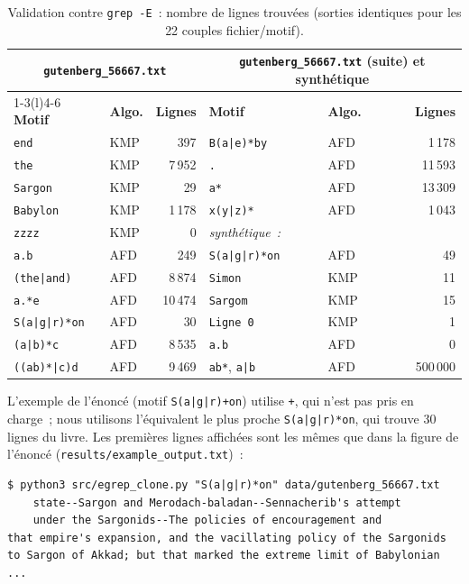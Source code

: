 \documentclass[11pt,a4paper]{article}
\begin{document}
\begin{table}[ht]
\centering
\small
\begin{tabular}{llr@{\hspace{2.5em}}llr}
\toprule
\multicolumn{3}{c}{\texttt{gutenberg\_56667.txt}} & \multicolumn{3}{c}{\texttt{gutenberg\_56667.txt} (suite) et synthétique} \\
\cmidrule(r){1-3}\cmidrule(l){4-6}
\textbf{Motif} & \textbf{Algo.} & \textbf{Lignes} & \textbf{Motif} & \textbf{Algo.} & \textbf{Lignes} \\
\midrule
\texttt{end}         & KMP & 397    & \texttt{B(a|e)*by}   & AFD & 1\,178 \\
\texttt{the}         & KMP & 7\,952 & \texttt{.}           & AFD & 11\,593 \\
\texttt{Sargon}      & KMP & 29     & \texttt{a*}          & AFD & 13\,309 \\
\texttt{Babylon}     & KMP & 1\,178 & \texttt{x(y|z)*}     & AFD & 1\,043 \\
\texttt{zzzz}        & KMP & 0      & \textit{synthétique~:} & & \\
\texttt{a.b}         & AFD & 249    & \texttt{S(a|g|r)*on} & AFD & 49 \\
\texttt{(the|and)}   & AFD & 8\,874 & \texttt{Simon}       & KMP & 11 \\
\texttt{a.*e}        & AFD & 10\,474 & \texttt{Sargom}     & KMP & 15 \\
\texttt{S(a|g|r)*on} & AFD & 30     & \texttt{Ligne 0}     & KMP & 1 \\
\texttt{(a|b)*c}     & AFD & 8\,535 & \texttt{a.b}         & AFD & 0 \\
\texttt{((ab)*|c)d}  & AFD & 9\,469 & \texttt{ab*}, \texttt{a|b} & AFD & 500\,000 \\
\bottomrule
\end{tabular}
\caption{Validation contre \texttt{grep -E}~: nombre de lignes trouvées
(sorties identiques pour les 22 couples fichier/motif).}
\label{tab:validation}
\end{table}

L'exemple de l'énoncé (motif \texttt{S(a|g|r)+on}) utilise \texttt{+}, qui
n'est pas pris en charge~; nous utilisons l'équivalent le plus proche
\texttt{S(a|g|r)*on}, qui trouve 30 lignes du livre. Les premières lignes
affichées sont les mêmes que dans la figure de l'énoncé
(\texttt{results/example\_output.txt})~:
\begin{verbatim}
$ python3 src/egrep_clone.py "S(a|g|r)*on" data/gutenberg_56667.txt
    state--Sargon and Merodach-baladan--Sennacherib's attempt
    under the Sargonids--The policies of encouragement and
that empire's expansion, and the vacillating policy of the Sargonids
to Sargon of Akkad; but that marked the extreme limit of Babylonian
...
\end{verbatim}
\end{document}
